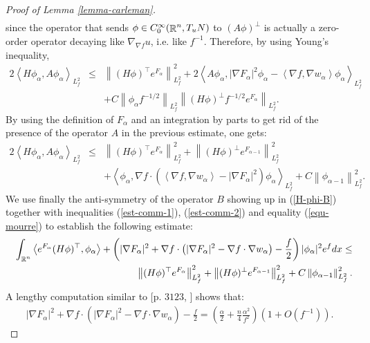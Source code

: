 \documentclass[a4paper,11pt,reqno]{amsart}
\def\R{\mathop{\rm \mathbb{R}}\nolimits}
\begin{document}
\begin{proof}[Proof of Lemma \ref{lemma-carleman}]
\begin{eqnarray*}
\end{eqnarray*}
since the operator that  sends $\phi\in C^{\infty}_0(\R^n,T_uN)$ to $(A\phi)^{\perp}$ is actually a zero-order operator decaying like $\nabla_{\nabla f}u$, i.e. like $f^{-1}$. Therefore, by using Young's inequality,
\begin{eqnarray*}
2\left<H\phi_{\alpha},A\phi_{\alpha}\right>_{L^2_f}&\leq&\left\|(H\phi)^{\top}e^{F_{\alpha}}\right\|_{L^2_f}^2+2\left<A\phi_{\alpha},|\nabla F_{\alpha}|^2\phi_{\alpha}-\left<\nabla f,\nabla w_{\alpha}\right>\phi_{\alpha}\right>_{L^2_f}\\
&&+C\left\|\phi_{\alpha}f^{-1/2}\right\|_{L^2_f}\left\|(H\phi)^{\perp}f^{-1/2}e^{F_{\alpha}}\right\|_{L^2_f}.
\end{eqnarray*}
By using the definition of $F_{\alpha}$ and an integration by parts to get rid of the presence of the operator $A$ in the previous estimate, one gets:
\begin{eqnarray}
2\left<H\phi_{\alpha},A\phi_{\alpha}\right>_{L^2_f}&\leq&\left\|(H\phi)^{\top}e^{F_{\alpha}}\right\|_{L^2_f}^2+\left\|(H\phi)^{\perp}e^{F_{\alpha-1}}\right\|_{L^2_f}^2\label{est-comm-1}\\
&&+\left<\phi_{\alpha},\nabla f\cdot(\left<\nabla f,\nabla w_{\alpha}\right>-|\nabla F_{\alpha}|^2)\phi_{\alpha}\right>_{L^2_f}
+C\left\|\phi_{\alpha-1}\right\|_{L^2_f}^2.\label{est-comm-2}
\end{eqnarray}
 We use finally the anti-symmetry of the operator $B$ showing up in (\ref{H-phi-B}) together with inequalities (\ref{est-comm-1}), (\ref{est-comm-2}) and equality (\ref{equ-mourre}) to establish the following estimate:
 \begin{eqnarray*}
&&\int_{\R^n}\left< e^{F_{\alpha}}(H\phi)^{\top},\phi_{\alpha}\right>+\left(|\nabla F_{\alpha}|^2+\nabla f\cdot\left(|\nabla F_{\alpha}|^2-\nabla f\cdot\nabla w_{\alpha}\right)-\frac{f}{2}\right)|\phi_{\alpha}|^2e^fdx\leq\\
&&\left\|(H\phi)^{\top}e^{F_{\alpha}}\right\|_{L^2_f}^2+\left\|(H\phi)^{\perp}e^{F_{\alpha-1}}\right\|_{L^2_f}^2+C\left\|\phi_{\alpha-1}\right\|_{L^2_f}^2.
\end{eqnarray*}
A lengthy computation similar to [p. $3123$, \cite{Uni-Con-Egs-Der}] shows that:
\begin{eqnarray*}
|\nabla F_{\alpha}|^2+\nabla f\cdot\left(|\nabla F_{\alpha}|^2-\nabla f\cdot\nabla w_{\alpha}\right)-\frac{f}{2}=\left(\frac{\alpha}{2}+\frac{n}{4}\frac{\alpha^2}{f^2}\right)(1+\textit{O}(f^{-1})).
\end{eqnarray*}

\end{proof}
\end{document}
